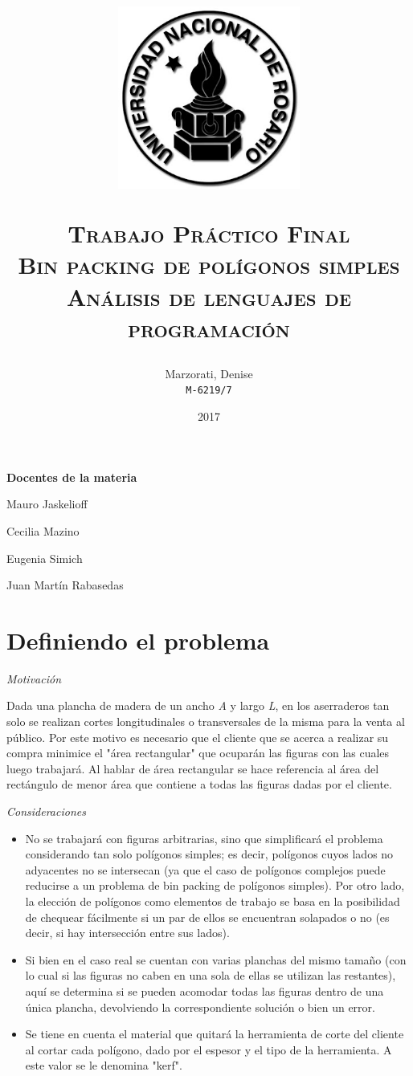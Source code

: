 \documentclass[a4paper,10pt]{article}
\author{
    Marzorati, Denise \\
    \texttt{M-6219/7}
}
\date{
    2017
}
\title{
    \begin{center}
    \includegraphics[width=6cm, height=6cm]{logo-unr.png}
    \end{center}
    \Huge \textsc{{\bfseries T}rabajo {\bfseries P}ráctico {\bfseries F}inal} \\
    \Huge \textsc{Bin packing de polígonos simples} \\
    \large \textsc{Análisis de lenguajes de programación} \\
}
\begin{document}
\bigskip
\bigskip
\bigskip

\maketitle

\thispagestyle{empty}

\begin{center}
\large \bf Docentes de la materia
\end{center}

\begin{center}

Mauro Jaskelioff

Cecilia Mazino

Eugenia Simich

Juan Martín Rabasedas

\end{center}

\large
\newpage{}

\section*{Definiendo el problema}

\textit {Motivación}

    \smallskip
    Dada una plancha de madera de un ancho \textit{A} y largo \textit{L}, en los aserraderos tan solo se
    realizan cortes longitudinales o transversales de la misma para la venta al público. Por este motivo es
    necesario que el cliente que se acerca a realizar su compra minimice el "área rectangular" que ocuparán
    las figuras con las cuales luego trabajará. Al hablar de área rectangular se hace referencia al área del 
    rectángulo de menor área que contiene a todas las figuras dadas por el cliente.

\medskip
\textit {Consideraciones}
    \begin{itemize}
        \item No se trabajará con figuras arbitrarias, sino que simplificará el problema considerando tan solo
    polígonos simples; es decir, polígonos cuyos lados no adyacentes no se intersecan (ya que el caso de
    polígonos complejos puede reducirse a un problema de bin packing de polígonos simples). Por
    otro lado, la elección de polígonos como elementos de trabajo se basa en la posibilidad de chequear
    fácilmente si un par de ellos se encuentran solapados o no (es decir, si hay intersección entre sus lados).
        \item Si bien en el caso real se cuentan con varias planchas del mismo tamaño (con lo cual si las
    figuras no caben en una sola de ellas se utilizan las restantes), aquí se determina si se pueden acomodar
    todas las figuras dentro de una única plancha, devolviendo la correspondiente solución o bien un error.
        \item Se tiene en cuenta el material que quitará la herramienta de corte del cliente al cortar cada
    polígono, dado por el espesor y el tipo de la herramienta. A este valor se le denomina "kerf". 
    \end{itemize}
\end{document}
